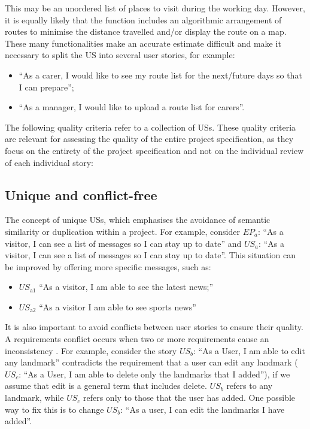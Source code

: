 This may be an unordered list of places to visit during the working day. However, it is equally likely that the function includes an algorithmic arrangement of routes to minimise the distance travelled and/or display the route on a map. These many functionalities make an accurate estimate difficult and make it necessary to split the US into several user stories, for example:
\begin{itemize}
\item \enquote{As a carer, I would like to see my route list for the next/future days so that I can prepare};
\item \enquote{As a manager, I would like to upload a route list for carers}.
\end{itemize}

The following quality criteria refer to a collection of USs. These quality criteria are relevant for assessing the quality of the entire project specification, as they focus on the entirety of the project specification and not on the individual review of each individual story:
\subsection*{\normalsize{Unique and conflict-free}}
The concept of unique USs, which emphasises the avoidance of semantic similarity or duplication within a project. For example, consider $EP_a$: \enquote{As a visitor, I can see a list of messages so I can stay up to date} and $US_a$: \enquote{As a visitor, I can see a list of messages so I can stay up to date}. This situation can be improved by offering more specific messages, such as:
\begin{itemize}
\item $US_{\text{a1}}$ \enquote{As a visitor, I am able to see the latest news;}
\item $US_{\text{a2}}$ \enquote{As a visitor I am able to see sports news}
\end{itemize}
It is also important to avoid conflicts between user stories to ensure their quality. A requirements conflict occurs when two or more requirements cause an inconsistency\cite{paja2013managing} \cite{robinson1989integrating}. For example, consider the story $US_b$: \enquote{As a User, I am able to edit any landmark} contradicts the requirement that a user can edit any landmark ($US_c$: \enquote{As a User, I am able to delete only the landmarks that I added}), if we assume that edit is a general term that includes delete. $US_b$ refers to any landmark, while $US_c$ refers only to those that the user has added. One possible way to fix this is to change $US_b$: \enquote{As a user, I can edit the landmarks I have added}. \cite{lucassen2016improving}

